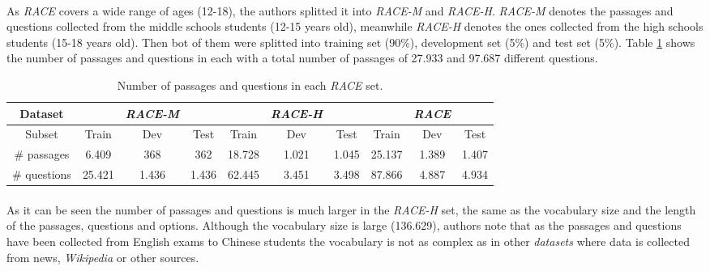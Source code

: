 \paragraph{}
As \emph{RACE} covers a wide range of ages (12-18), the authors splitted it into \emph{RACE-M} and \emph{RACE-H}. \emph{RACE-M} denotes the passages and questions collected from the middle schools students (12-15 years old), meanwhile \emph{RACE-H} denotes the ones collected from the high schools students (15-18 years old). Then bot of them were splitted into training set (90\%), development set (5\%) and test set (5\%). Table \ref{tab:race-sets} shows the number of passages and questions in each with a total number of passages of 27.933 and 97.687 different questions.
\begin{table}[!h]
	\begin{tabular}{|c|ccc|ccc|ccc|}
	\hline 
	Dataset &  & \emph{RACE-M} &  &  & \emph{RACE-H} &  &  & \emph{RACE} & \\ 
	\hline 
	Subset & Train & Dev & Test & Train & Dev & Test & Train & Dev & Test \\ 
	\hline 
	\# passages & 6.409 & 368 & 362 & 18.728 & 1.021 & 1.045 & 25.137 & 1.389 & 1.407 \\ 
	\hline 
	\# questions & 25.421 & 1.436 & 1.436 & 62.445 & 3.451 & 3.498 & 87.866 & 4.887 & 4.934 \\ 
	\hline 
	\end{tabular} 
	\caption{Number of passages and questions in each \emph{RACE} set.}
	\label{tab:race-sets}
\end{table}
\paragraph{}
As it can be seen the number of passages and questions is much larger in the \emph{RACE-H} set, the same as the vocabulary size and the length of the passages, questions and options. Although the vocabulary size is large (136.629), authors note that as the passages and questions have been collected from English exams to Chinese students the vocabulary is not as complex as in other \emph{datasets} where data is collected from news, \emph{Wikipedia} or other sources. 
